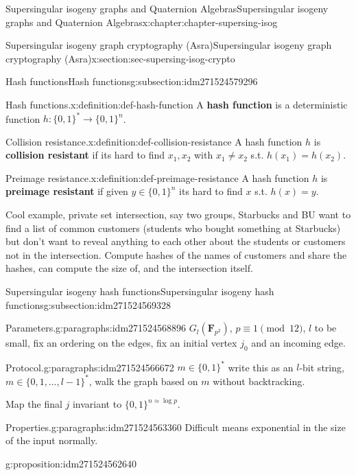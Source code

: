 \documentclass[oneside,10pt,]{book}
\newcommand{\terminology}[1]{\textbf{#1}}
\numberwithin{equation}{section}
\newcommand{\FF}{\mathbf{F}}
\begin{document}
\begin{chapterptx}{Supersingular isogeny graphs and Quaternion Algebras}{}{Supersingular isogeny graphs and Quaternion Algebras}{}{}{x:chapter:chapter-supersing-isog}
\begin{sectionptx}{Supersingular isogeny graph cryptography (Asra)}{}{Supersingular isogeny graph cryptography (Asra)}{}{}{x:section:sec-supersing-isog-crypto}
\begin{subsectionptx}{Hash functions}{}{Hash functions}{}{}{g:subsection:idm271524579296}
\begin{definition}{Hash functions.}{x:definition:def-hash-function}
A \terminology{hash function} is a deterministic function \(h\colon \{0,1\}^* \to \{0,1\}^n\).%
\end{definition}
\begin{definition}{Collision resistance.}{x:definition:def-collision-resistance}%
A hash function \(h\) is \terminology{collision resistant} if its hard to find \(x_1,x_2\) with \(x_1\ne x_2 \) s.t. \(h(x_1) = h(x_2)\).%
\end{definition}
\begin{definition}{Preimage resistance.}{x:definition:def-preimage-resistance}%
A hash function \(h\) is \terminology{preimage resistant} if given \(y\in \{0,1\}^n\) its hard to find \(x\) s.t. \(h(x) = y\).%
\end{definition}
Cool example, private set intersection, say two groups, Starbucks and BU want to find a list of common customers (students who bought something at Starbucks) but don't want to reveal anything to each other about the students or customers not in the intersection. Compute hashes of the names of customers and share the hashes, can compute the size of, and the intersection itself.%
\end{subsectionptx}
%
%
\typeout{************************************************}
\typeout{************************************************}
%
\begin{subsectionptx}{Supersingular isogeny hash functions}{}{Supersingular isogeny hash functions}{}{}{g:subsection:idm271524569328}
\begin{paragraphs}{Parameters.}{g:paragraphs:idm271524568896}%
\(G_l(\FF_{p^2})\), \(p \equiv 1 \pmod{12}\), \(l\) to be small, fix an ordering on the edges, fix an initial vertex \(j_0\) and an incoming edge.%
\end{paragraphs}%
\begin{paragraphs}{Protocol.}{g:paragraphs:idm271524566672}%
\(m \in \{0,1\}^*\) write this as an \(l\)-bit string, \(m \in \{0,1,\ldots, l-1\}^*\), walk the graph based on \(m\) without backtracking.%
\par
Map the final \(j\) invariant to  \(\{0,1\}^{n\approx \log p}\).%
\end{paragraphs}%
\begin{paragraphs}{Properties.}{g:paragraphs:idm271524563360}%
Difficult means exponential in the size of the input normally.%
\begin{proposition}{}{}{g:proposition:idm271524562640}%
%
\begin{enumerate}

\end{enumerate}
\end{proposition}
\end{paragraphs}
\end{subsectionptx}
\end{sectionptx}
\end{chapterptx}
\end{document}
